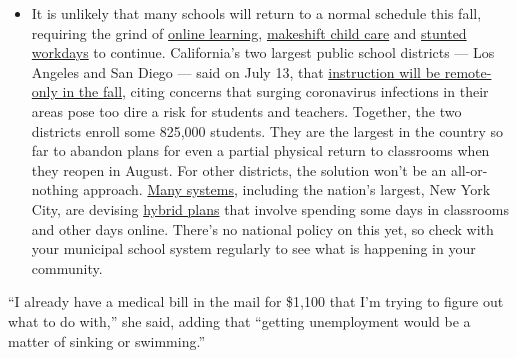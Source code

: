 \begin{itemize}
  \begin{itemize}
  \tightlist
  \item
    It is unlikely that many schools will return to a normal schedule
    this fall, requiring the grind of
    \href{https://www.nytimes3xbfgragh.onion/2020/06/05/us/coronavirus-education-lost-learning.html?action=click\&pgtype=Article\&state=default\&region=MAIN_CONTENT_3\&context=storylines_faq}{online
    learning},
    \href{https://www.nytimes3xbfgragh.onion/2020/05/29/us/coronavirus-child-care-centers.html?action=click\&pgtype=Article\&state=default\&region=MAIN_CONTENT_3\&context=storylines_faq}{makeshift
    child care} and
    \href{https://www.nytimes3xbfgragh.onion/2020/06/03/business/economy/coronavirus-working-women.html?action=click\&pgtype=Article\&state=default\&region=MAIN_CONTENT_3\&context=storylines_faq}{stunted
    workdays} to continue. California's two largest public school
    districts --- Los Angeles and San Diego --- said on July 13, that
    \href{https://www.nytimes3xbfgragh.onion/2020/07/13/us/lausd-san-diego-school-reopening.html?action=click\&pgtype=Article\&state=default\&region=MAIN_CONTENT_3\&context=storylines_faq}{instruction
    will be remote-only in the fall}, citing concerns that surging
    coronavirus infections in their areas pose too dire a risk for
    students and teachers. Together, the two districts enroll some
    825,000 students. They are the largest in the country so far to
    abandon plans for even a partial physical return to classrooms when
    they reopen in August. For other districts, the solution won't be an
    all-or-nothing approach.
    \href{https://bioethics.jhu.edu/research-and-outreach/projects/eschool-initiative/school-policy-tracker/}{Many
    systems}, including the nation's largest, New York City, are
    devising
    \href{https://www.nytimes3xbfgragh.onion/2020/06/26/us/coronavirus-schools-reopen-fall.html?action=click\&pgtype=Article\&state=default\&region=MAIN_CONTENT_3\&context=storylines_faq}{hybrid
    plans} that involve spending some days in classrooms and other days
    online. There's no national policy on this yet, so check with your
    municipal school system regularly to see what is happening in your
    community.
  \end{itemize}
\end{itemize}

``I already have a medical bill in the mail for \$1,100 that I'm trying
to figure out what to do with,'' she said, adding that ``getting
unemployment would be a matter of sinking or swimming.''

